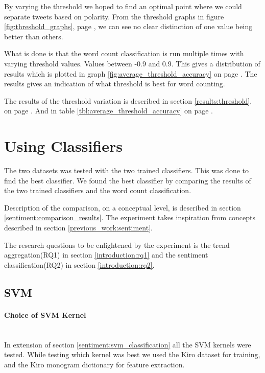 By varying the threshold we hoped to find an optimal point where we could
separate tweets based on polarity. From the threshold graphs in figure
\ref{fig:threshold_graphs}, page \pageref{fig:threshold_graphs}, we can see no
clear distinction of one value being better than others.

What is done is that the word count classification is run multiple
times with varying threshold values. Values between -0.9 and 0.9. This gives a
distribution of results which is plotted in graph
\ref{fig:average_threshold_accuracy} on page
\pageref{fig:average_threshold_accuracy}.
The results gives an indication of what threshold is best for word counting. 

The results of the threshold variation is described in section
\ref{results:threshold}, on page \pageref{results:threshold}. And in table
\ref{tbl:average_threshold_accuracy} on page
\pageref{tbl:average_threshold_accuracy}.
%

\section{Using Classifiers}\label{experiments:calssifiers}
The two datasets was tested with the two trained classifiers.
This was done to find the best classifier.
We found the best classifier by comparing the results of the two trained
classifiers and the word count classification. 

Description of the comparison, on a conceptual level, is described in section
\ref{sentiment:comparison_results}. 
The experiment takes inspiration from concepts described in section
\ref{previous_work:sentiment}.

The research questions to be enlightened by the experiment is the trend
aggregation(RQ1) in section \ref{introduction:rq1} and the sentiment
classification(RQ2) in section \ref{introduction:rq2}.
%

\subsection{SVM}\label{experiments:svm_classification}

\paragraph{Choice of SVM Kernel}\label{experiments:svm_kernel}
\hspace{0pt}\\
In extension of section \ref{sentiment:svm_classification} all the SVM kernels were
tested.
While testing which kernel was best we used the Kiro dataset for training, and
the Kiro monogram dictionary for feature extraction.

